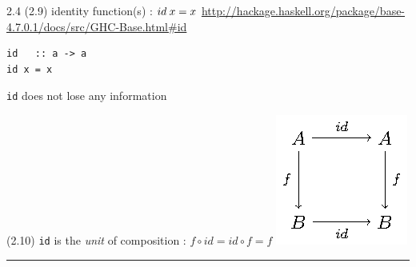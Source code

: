 \documentclass[presentation]{beamer}
\begin{document}
\begin{frame}[fragile,label=sec-3]{2.4  (2.9) identity function(s) : $id \hspace{0.25em} x = x$}
 \url{http://hackage.haskell.org/package/base-4.7.0.1/docs/src/GHC-Base.html#id}

\begin{verbatim}
id   :: a -> a
id x = x
\end{verbatim}

\texttt{id} does not lose any information

\begin{block}{(2.10) \texttt{id} is the \emph{unit} of composition : $f \circ id = id \circ f = f$}
\includegraphics[width=.9\linewidth]{./function-composition-id-is-unit.png}

\rule{\linewidth}{0.5pt}
\end{block}
\end{frame}
\end{document}
